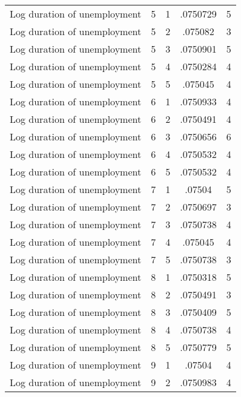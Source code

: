 \begin{tabular}{l*{4}{c}}
Log duration of unemployment&           5&           1&    .0750729&           5\\
Log duration of unemployment&           5&           2&     .075082&           3\\
Log duration of unemployment&           5&           3&    .0750901&           5\\
Log duration of unemployment&           5&           4&    .0750284&           4\\
Log duration of unemployment&           5&           5&     .075045&           4\\
Log duration of unemployment&           6&           1&    .0750933&           4\\
Log duration of unemployment&           6&           2&    .0750491&           4\\
Log duration of unemployment&           6&           3&    .0750656&           6\\
Log duration of unemployment&           6&           4&    .0750532&           4\\
Log duration of unemployment&           6&           5&    .0750532&           4\\
Log duration of unemployment&           7&           1&      .07504&           5\\
Log duration of unemployment&           7&           2&    .0750697&           3\\
Log duration of unemployment&           7&           3&    .0750738&           4\\
Log duration of unemployment&           7&           4&     .075045&           4\\
Log duration of unemployment&           7&           5&    .0750738&           3\\
Log duration of unemployment&           8&           1&    .0750318&           5\\
Log duration of unemployment&           8&           2&    .0750491&           3\\
Log duration of unemployment&           8&           3&    .0750409&           5\\
Log duration of unemployment&           8&           4&    .0750738&           4\\
Log duration of unemployment&           8&           5&    .0750779&           5\\
Log duration of unemployment&           9&           1&      .07504&           4\\
Log duration of unemployment&           9&           2&    .0750983&           4\\

\end{tabular}
